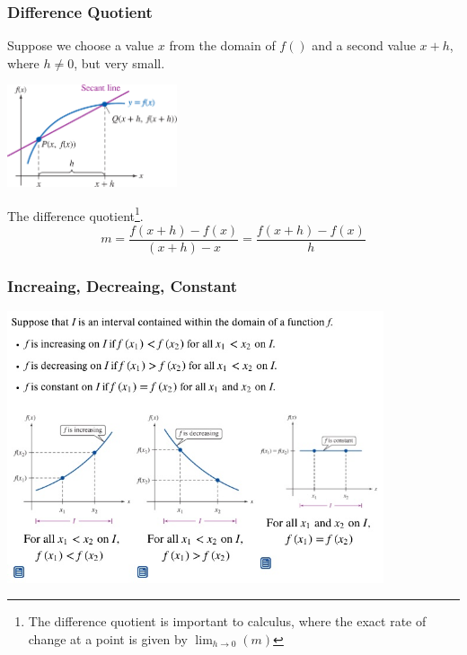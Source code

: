 \documentclass{beamer}
\begin{document}
\begin{frame}\frametitle{Difference Quotient}
Suppose we choose a value $x$ from the domain of $f()$ and a second value $x + h$, where $h \neq 0$, but very small.

\begin{center}
\includegraphics[width=5cm]{fig/roc2.png}
\end{center}

The difference quotient\footnote{The difference quotient is important to calculus, where the exact rate of change at a point is given by $ \lim_{h \rightarrow 0}(m) $}.
\begin{equation}
m = \frac{f(x+h) - f(x)}{(x+h) - x} = \frac{f(x+h) - f(x)}{h}
\end{equation}

\end{frame}

\begin{frame}\frametitle{Increaing, Decreaing, Constant}
\begin{center}
\includegraphics[height=8cm]{fig/idc.jpg}
\end{center}
\end{frame}
\end{document}
